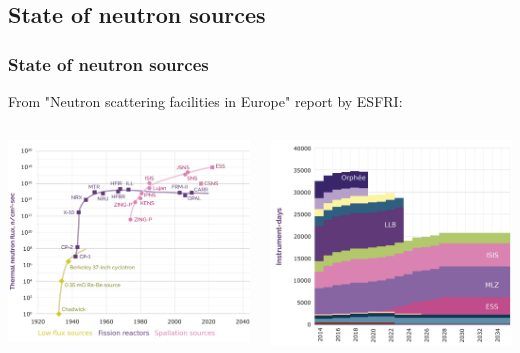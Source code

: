 \subsection{State of neutron sources}
\begin{frame}
  \frametitle{State of neutron sources}
  From "Neutron scattering facilities in Europe" report by ESFRI:
  \begin{columns}
    \begin{column}{0.50\textwidth}
      \includegraphics[width=\textwidth]{01_Neutron/fig/fig000_NeutronSources_a2}
    \end{column}
    \begin{column}{0.50\textwidth}
      \includegraphics[width=\textwidth]{01_Neutron/fig/fig000_NeutronSources_b2}

\end{column}
\end{columns}
\end{frame}

